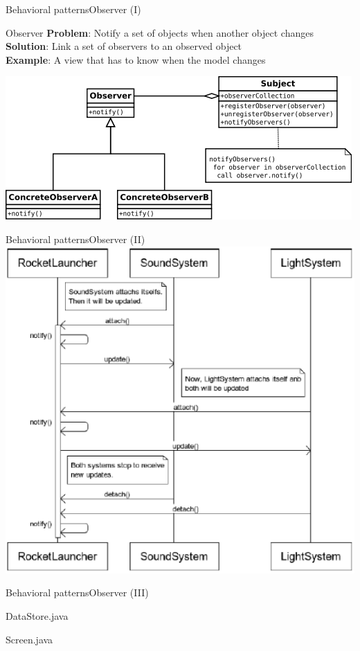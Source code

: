 \documentclass[10pt,compress]{beamer} %
\begin{document}
\begin{frame}{Behavioral patterns}{Observer (I)}
	   \begin{block}{Observer}
			\textbf{Problem}: Notify a set of objects when another object changes\\
			\textbf{Solution}: Link a set of observers to an observed object\\
			\textbf{Example}: A view that has to know when the model changes\\
		\end{block}
		\bigskip
		\centering\includegraphics[width=0.7\linewidth]{figs/observer}
\end{frame}

\begin{frame}[plain]{Behavioral patterns}{Observer (II)}
	\centering\includegraphics[width=0.6\linewidth]{figs/observergame}
\end{frame}

\begin{frame}{Behavioral patterns}{Observer (III)}
	\vspace{-0.3cm}
    \begin{block}{DataStore.java}
	    \vspace{-0.2cm}
	    
		\vspace{-0.2cm}
	\end{block}

	\vspace{-0.2cm}
    \begin{block}{Screen.java}
	    \vspace{-0.2cm}
	    
		\vspace{-0.3cm}
	\end{block}
\end{frame}
\end{document}
